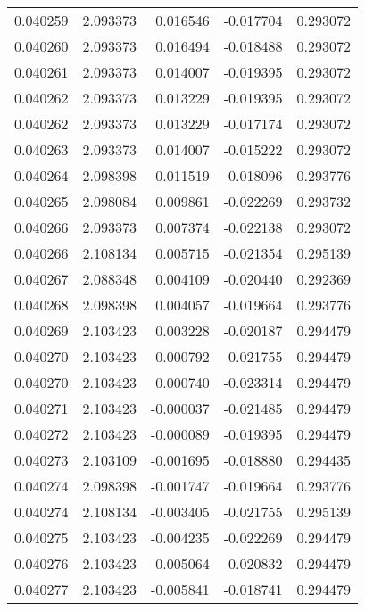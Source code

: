 \begin{tabular}{lrrrr}
0.040259    &  2.093373 &  0.016546 & -0.017704 &             0.293072 \\
0.040260    &  2.093373 &  0.016494 & -0.018488 &             0.293072 \\
0.040261    &  2.093373 &  0.014007 & -0.019395 &             0.293072 \\
0.040262    &  2.093373 &  0.013229 & -0.019395 &             0.293072 \\
0.040262    &  2.093373 &  0.013229 & -0.017174 &             0.293072 \\
0.040263    &  2.093373 &  0.014007 & -0.015222 &             0.293072 \\
0.040264    &  2.098398 &  0.011519 & -0.018096 &             0.293776 \\
0.040265    &  2.098084 &  0.009861 & -0.022269 &             0.293732 \\
0.040266    &  2.093373 &  0.007374 & -0.022138 &             0.293072 \\
0.040266    &  2.108134 &  0.005715 & -0.021354 &             0.295139 \\
0.040267    &  2.088348 &  0.004109 & -0.020440 &             0.292369 \\
0.040268    &  2.098398 &  0.004057 & -0.019664 &             0.293776 \\
0.040269    &  2.103423 &  0.003228 & -0.020187 &             0.294479 \\
0.040270    &  2.103423 &  0.000792 & -0.021755 &             0.294479 \\
0.040270    &  2.103423 &  0.000740 & -0.023314 &             0.294479 \\
0.040271    &  2.103423 & -0.000037 & -0.021485 &             0.294479 \\
0.040272    &  2.103423 & -0.000089 & -0.019395 &             0.294479 \\
0.040273    &  2.103109 & -0.001695 & -0.018880 &             0.294435 \\
0.040274    &  2.098398 & -0.001747 & -0.019664 &             0.293776 \\
0.040274    &  2.108134 & -0.003405 & -0.021755 &             0.295139 \\
0.040275    &  2.103423 & -0.004235 & -0.022269 &             0.294479 \\
0.040276    &  2.103423 & -0.005064 & -0.020832 &             0.294479 \\
0.040277    &  2.103423 & -0.005841 & -0.018741 &             0.294479 \\

\end{tabular}
